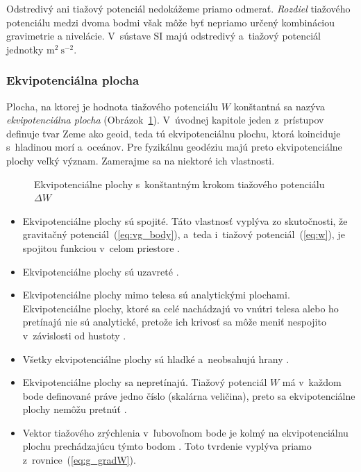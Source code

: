 \documentclass[a4paper, 12pt]{book}
\begin{document}
Odstredivý ani tiažový potenciál nedokážeme priamo odmerať.  \emph{Rozdiel} 
tiažového potenciálu medzi dvoma bodmi však môže byť nepriamo určený 
kombináciou gravimetrie a nivelácie.  V~sústave SI majú odstredivý a~tiažový 
potenciál jednotky $\mathrm{m}^2 \ \mathrm{s}^{-2}$.

\subsubsection{Ekvipotenciálna plocha}

Plocha, na ktorej je hodnota tiažového potenciálu $W$ konštantná sa nazýva
\emph{ekvipotenciálna plocha} (Obrázok~\ref{fig:equipotential_surfaces}).
V~úvodnej kapitole jeden z~prístupov definuje tvar Zeme ako geoid, teda tú
ekvipotenciálnu plochu, ktorá koinciduje s~hladinou morí a~oceánov.  Pre
fyzikálnu geodéziu majú preto ekvipotenciálne plochy veľký význam.  Zamerajme
sa na niektoré ich vlastnosti.

\begin{figure}
\centering

\caption{Ekvipotenciálne plochy s~konštantným krokom tiažového potenciálu
$\Delta W$}
\label{fig:equipotential_surfaces}
\end{figure}

\begin{itemize}
\item Ekvipotenciálne plochy sú spojité.  Táto vlastnosť vyplýva zo
skutočnosti, že gravitačný potenciál~(\ref{eq:vg_body}), a~teda i~tiažový
potenciál~(\ref{eq:w}), je spojitou funkciou v~celom priestore
\citep{Janak2006}.

\item Ekvipotenciálne plochy sú uzavreté \citep{VanicekGeodesy}.

\item Ekvipotenciálne plochy mimo telesa sú analytickými plochami.
Ekvipotenciálne plochy, ktoré sa celé nachádzajú vo vnútri telesa alebo ho
pretínajú nie sú analytické, pretože ich krivosť sa môže meniť nespojito
v~závislosti od hustoty \citep{MoritzPhysicalGeodesy}.

\item Všetky ekvipotenciálne plochy sú hladké a~neobsahujú hrany
\citep{MoritzPhysicalGeodesy}.

\item Ekvipotenciálne plochy sa nepretínajú.  Tiažový potenciál $W$ má v~každom
bode definované práve jedno číslo (skalárna veličina), preto sa ekvipotenciálne
plochy nemôžu pretnúť \citep{MacMillan1930}.

\item Vektor tiažového zrýchlenia v~ľubovoľnom bode je kolmý na ekvipotenciálnu
plochu prechádzajúcu týmto bodom \citep{MoritzPhysicalGeodesy}.  Toto tvrdenie
vyplýva priamo z~rovnice~(\ref{eq:g_gradW}).
\end{itemize}
\end{document}
